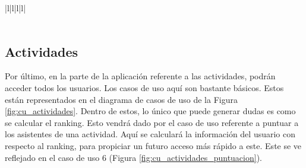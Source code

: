 \begin{table}[h!]
{\begin{tabular}{|l|l|l|l|}
        \hline
                                                                                                                                                                                                                                \\ 
        \hline
                                                                                                                                                \\
        \hline
        \end{tabular}
    }
    \caption{Curso de eventos del caso de uso 5}
\end{table}

\newpage
\newpage

\subsection{Actividades}

Por último, en la parte de la aplicación referente a las actividades, podrán acceder todos los usuarios. Los casos de uso aquí son bastante básicos. Estos están representados en el diagrama de casos de uso de la Figura \ref{fig:cu_actividades}. Dentro de estos, lo único que puede generar dudas es como se calcular el ranking. Esto vendrá dado por el caso de uso referente a puntuar a los asistentes de una actividad. Aquí se calculará la información del usuario con respecto al ranking, para propiciar un futuro acceso más rápido a este. Este se ve reflejado en el caso de uso 6 (Figura \ref{fig:cu_actividades_puntuacion}).

